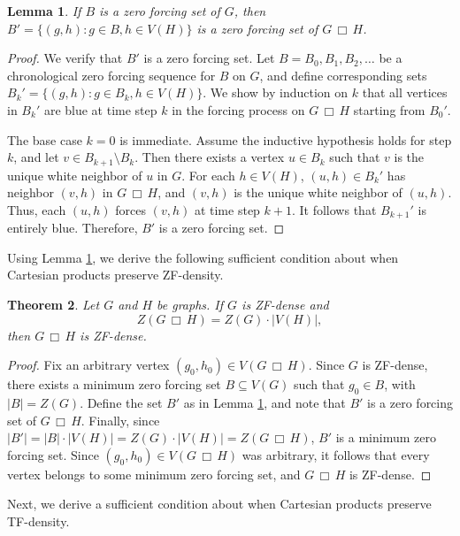 \documentclass[11pt]{article}
\newtheorem{thm}{Theorem}
\newtheorem{lem}[thm]{Lemma}
\theoremstyle{definition}
\newcommand{\cprod}{\,\Box\,}
\newcommand{\1}{\vspace{0.1cm}}
\newcommand{\2}{\vspace{0.2cm}}
\newcommand{\3}{\vspace{0.3cm}}
\begin{document}
\begin{lem}\label{zfbox}
If $B$ is a zero forcing set of $G$, then $B'=\{(g,h):g \in B, h \in V(H)\}$ is a zero forcing set of $G \cprod H$.
\end{lem}

\begin{proof}
We verify that $ B' $ is a zero forcing set. Let $ B = B_0, B_1, B_2, \dots $ be a chronological zero forcing sequence for $ B $ on $ G $, and define corresponding sets $ B_k' = \{ (g,h) : g \in B_k, h \in V(H) \} $. We show by induction on $ k $ that all vertices in $ B_k' $ are blue at time step $ k $ in the forcing process on $ G \cprod H $ starting from $ B_0' $.

The base case $ k = 0 $ is immediate. Assume the inductive hypothesis holds for step $ k $, and let $ v \in B_{k+1} \setminus B_k $. Then there exists a vertex $ u \in B_k $ such that $ v $ is the unique white neighbor of $ u $ in $ G $. For each $ h \in V(H) $, $ (u,h) \in B_k' $ has neighbor $ (v,h) $ in $ G \cprod H $, and $ (v,h) $ is the unique white neighbor of $ (u,h) $. Thus, each $ (u,h) $ forces $ (v,h) $ at time step $ k+1 $. It follows that $ B_{k+1}' $ is entirely blue. Therefore, $ B' $ is a zero forcing set.
\end{proof}

Using Lemma \ref{zfbox}, we derive the following sufficient condition about when Cartesian products preserve ZF-density.

\begin{thm}\label{t:cart_z}
Let $ G $ and $ H $ be graphs. If $ G $ is ZF-dense and
\[
Z(G \cprod H) = Z(G) \cdot |V(H)|,
\]
then $ G \cprod H $ is ZF-dense.
\end{thm}

\begin{proof}
Fix an arbitrary vertex $ (g_0, h_0) \in V(G \cprod H) $. Since $ G $ is ZF-dense, there exists a minimum zero forcing set $ B \subseteq V(G) $ such that $ g_0 \in B $, with $ |B| = Z(G) $. 
 Define the set $B'$ as in Lemma \ref{zfbox}, and note that $B'$ is a zero forcing set of $G \cprod H$.  Finally, since $ |B'| = |B| \cdot |V(H)| = Z(G) \cdot |V(H)| = Z(G \cprod H) $, $ B' $ is a minimum zero forcing set. Since $ (g_0, h_0) \in V(G \cprod H) $ was arbitrary, it follows that every vertex belongs to some minimum zero forcing set, and $ G \cprod H $ is ZF-dense.
\end{proof}

Next, we derive a sufficient condition about when Cartesian products preserve TF-density.
\end{document}
